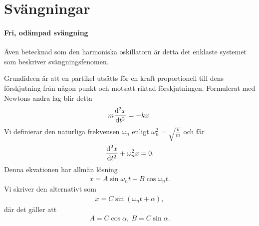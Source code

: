 \section{Svängningar}

\paragraph{Fri, odämpad svängning}
Även betecknad som den harmoniska oskillatorn är detta det enklaste systemet som beskriver svängningsfenomen.

Grundideen är att en partikel utsätts för en kraft proportionell till dens förskjutning från någon punkt och motsatt riktad förskjutningen. Formulerat med Newtons andra lag blir detta
\begin{align*}
	m\dv[2]{x}{t} = -kx.
\end{align*}
Vi definierar den naturliga frekvensen $\omega_n$ enligt $\omega_n^2 = \sqrt{\frac{k}{m}}$ och får
\begin{align*}
	\dv[2]{x}{t} + \omega_n^2x = 0.
\end{align*}
Denna ekvationen har allmän lösning
\begin{align*}
	x = A\sin{\omega_nt} + B\cos{\omega_nt}.
\end{align*}
Vi skriver den alternativt som
\begin{align*}
	x = C\sin{(\omega_nt + \alpha)},
\end{align*}
där det gäller att
\begin{align*}
	A = C\cos{\alpha},\ B = C\sin{\alpha}.
\end{align*}